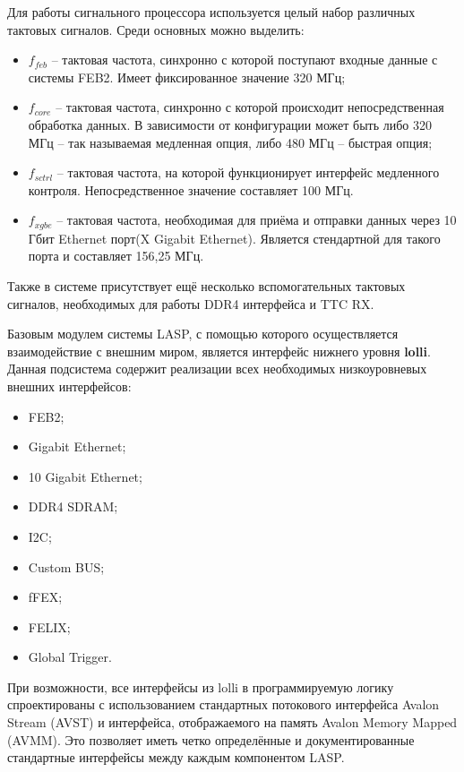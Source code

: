 Для работы сигнального процессора используется целый набор различных тактовых сигналов. Среди основных можно выделить:
\begin{itemize}
    \item $f_{feb}$ -- тактовая частота, синхронно с которой поступают входные данные с системы FEB2. Имеет фиксированное значение 320 МГц;
    \item $f_{core}$ --  тактовая частота, синхронно с которой происходит непосредственная обработка данных. В зависимости от конфигурации может быть либо 320 МГц -- так называемая медленная опция, либо 480 МГц -- быстрая опция;
    \item $f_{sctrl}$ -- тактовая частота, на которой функционирует интерфейс медленного контроля. Непосредственное значение составляет 100 МГц.
    \item $f_{xgbe}$ -- тактовая частота, необходимая для приёма и отправки данных через 10 Гбит Ethernet порт(X Gigabit Ethernet). Является стендартной для такого порта и составляет 156,25 МГц.
\end{itemize}\par
Также в системе присутствует ещё несколько вспомогательных тактовых сигналов, необходимых для работы DDR4 интерфейса и TTC RX.\par
Базовым модулем системы LASP, с помощью которого осуществляется взаимодействие с внешним миром, является интерфейс нижнего уровня \textbf{lolli}. Данная подсистема содержит реализации всех необходимых низкоуровневых внешних интерфейсов:\par
\begin{itemize}
    \item FEB2;
    \item Gigabit Ethernet;
    \item 10 Gigabit Ethernet;
    \item DDR4 SDRAM;
    \item I2C;
    \item Custom BUS;
    \item fFEX;
    \item FELIX;
    \item Global Trigger.
\end{itemize}\par
При возможности, все интерфейсы из lolli в программируемую логику спроектированы с использованием стандартных потокового интерфейса Avalon Stream (AVST) и интерфейса, отображаемого на память Avalon Memory Mapped (AVMM). Это позволяет иметь четко определённые и документированные стандартные интерфейсы между каждым компонентом LASP.\par
